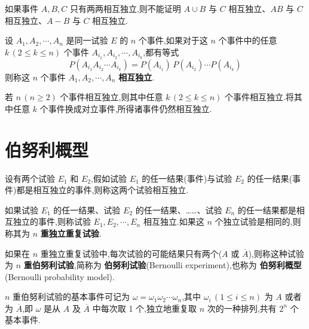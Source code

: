 \begin{note}
    \indent 如果事件 $A,B,C$ 只有两两相互独立,则不能证明 $A \cup B$ 与 $C$ 相互独立、$AB$ 与 $C$ 相互独立、$A-B$ 与 $C$ 相互独立.
\end{note}

\begin{definition}
    \indent 设 $A_1,A_2,\cdots,A_n$ 是同一试验 $E$ 的 $n$ 个事件,如果对于这 $n$ 个事件中的任意 $k\,(2\leqslant k\leqslant n)$ 个事件 $A_{i_1},A_{i_2},\cdots,A_{i_k}$,都有等式
    $$
    P(A_{i_1} A_{i_2} \cdots A_{i_k}) = P(A_{i_1}) \, P(A_{i_2}) \cdots P(A_{i_k})
    $$
    则称这 $n$ 个事件 $A_1,A_2,\cdots,A_n$ \textbf{相互独立}.
\end{definition}

\begin{conclusion}
    \indent 若 $n\, (n \geqslant 2)$ 个事件相互独立,则其中任意 $k\, (2 \leqslant k \leqslant n)$ 个事件相互独立.将其中任意 $k$ 个事件换成对立事件,所得诸事件仍然相互独立.
\end{conclusion}

\section{伯努利概型}

\begin{definition}
    \indent 设有两个试验 $E_1$ 和 $E_2$,假如试验 $E_1$ 的任一结果(事件)与试验 $E_2$ 的任一结果(事件)都是相互独立的事件,则称这两个试验相互独立.
\end{definition}

\begin{definition}
    \indent 如果试验 $E_1$ 的任一结果、试验 $E_2$ 的任一结果、……、试验 $E_n$ 的任一结果都是相互独立的事件,则称试验 $E_1, E_2, \cdots, E_n$ 相互独立.如果这 $n$ 个独立试验是相同的,则称其为 $n$ \textbf{重独立重复试验}.
\end{definition}

\begin{definition}
    \indent 如果在 $n$ 重独立重复试验中,每次试验的可能结果只有两个($A$ 或 $\overline{A}$),则称这种试验为 $n$ \textbf{重伯努利试验},简称为 \textbf{伯努利试验}(Bernoulli experiment),也称为 \textbf{伯努利概型}(Bernoulli probability model).
\end{definition}

$n$ 重伯努利试验的基本事件可记为 $\omega=\omega_1 \omega_2 \cdots \omega_n$,其中 $\omega_i\,(1\leqslant i\leqslant n)$ 为 $A$ 或者为 $\overline{A}$,即 $\omega$ 是从 $A$ 及 $\overline{A}$ 中每次取 1 个,独立地重复取 $n$ 次的一种排列,共有 $2^n$ 个基本事件.

